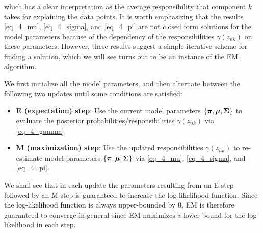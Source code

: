 \documentclass[../book-template.tex]{subfiles}
\begin{document}
which has a clear interpretation as the average responsibility that component $k$ takes for explaining the data points. It is worth emphasizing that the results \eqref{eq_4_mu}, \eqref{eq_4_sigma}, and \eqref{eq_4_pi} are not closed form solutions for the model parameters because of the dependency of the responsibilities $\gamma(z_{nk})$ on these parameters. However, these results suggest a simple iterative scheme for finding a solution, which we will see turns out to be an instance of the EM algorithm. 
\par We first initialize all the model parameters, and then alternate between the following two updates until some conditions are satisfied:
\begin{itemize}
	\item  \textbf{E (expectation) step}: Use the current model parameters $\{\bm{\pi}, \bm{\mu}, {\bf \Sigma}\}$ to evaluate the posterior probabilities/responsibilities $\gamma(z_{nk})$ via \eqref{eq_4_gamma}.
	\item  \textbf{M (maximization) step}: Use the updated responsibilities $\gamma(z_{nk})$ to re-estimate model parameters $\{\bm{\pi}, \bm{\mu}, {\bf \Sigma}\}$ via \eqref{eq_4_mu}, \eqref{eq_4_sigma}, and \eqref{eq_4_pi}.
\end{itemize}
We shall see that in each update the parameters resulting from an E step followed by an M step is guaranteed to increase the log-likelihood function. Since the log-likelihood function is always upper-bounded by 0, EM is therefore guaranteed to converge in general since EM maximizes a lower bound for the log-likelihood in each step.
\end{document}
